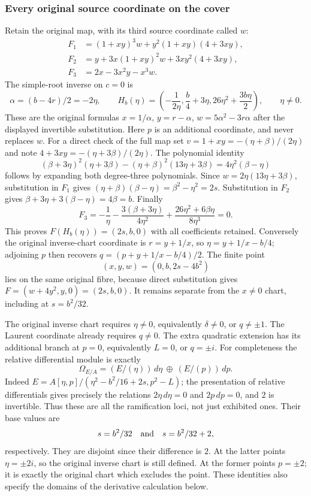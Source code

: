 \subsubsection{Every original source coordinate on the cover}
Retain the original map, with its third source coordinate called $w$:
\begin{align*}
 F_1&=(1+xy)^3w+y^2(1+xy)(4+3xy),\\
 F_2&=y+3x(1+xy)^2w+3xy^2(4+3xy),\\
 F_3&=2x-3x^2y-x^3w.
\end{align*}
The simple-root inverse on $c=0$ is
\begin{equation}\label{eq:rb-source-H}
 \alpha=(b-4r)/2=-2\eta,\qquad
 H_b(\eta)=
 \left(-\frac1{2\eta},\frac b4+3\eta,
                 26\eta^2+\frac{3b\eta}{2}\right),\qquad\eta\ne0.
\end{equation}
These are the original formulas $x=1/\alpha$, $y=r-\alpha$,
$w=5\alpha^2-3r\alpha$ after the displayed invertible substitution.
Here $p$ is an additional coordinate, and never replaces $w$.
For a direct check of the full map set
$v=1+xy=-(\eta+\beta)/(2\eta)$ and note
$4+3xy=-(\eta+3\beta)/(2\eta)$. The polynomial identity
\[
 (\beta+3\eta)^2(\eta+3\beta)
 -(\eta+\beta)^2(13\eta+3\beta)=4\eta^2(\beta-\eta)
\]
follows by expanding both degree-three polynomials. Since
$w=2\eta(13\eta+3\beta)$, substitution in $F_1$ gives
$(\eta+\beta)(\beta-\eta)=\beta^2-\eta^2=2s$.
Substitution in $F_2$ gives
$\beta+3\eta+3(\beta-\eta)=4\beta=b$. Finally
\[
 F_3=-\frac1\eta-\frac{3(\beta+3\eta)}{4\eta^2}
                       +\frac{26\eta^2+6\beta\eta}{8\eta^3}=0.
\]
This proves $F(H_b(\eta))=(2s,b,0)$ with all coefficients retained.
Conversely the original inverse-chart coordinate is
$r=y+1/x$, so $\eta=y+1/x-b/4$; adjoining $p$ then recovers
$q=(p+y+1/x-b/4)/2$. The finite point
\[
 (x,y,w)=(0,b,2s-4b^2)
\]
lies on the same original fibre, because direct substitution gives
$F=(w+4y^2,y,0)=(2s,b,0)$. It remains separate from the $x\ne0$
chart, including at $s=b^2/32$.

The original inverse chart requires $\eta\ne0$, equivalently
$\delta\ne0$, or $q\ne\pm1$. The Laurent coordinate already
requires $q\ne0$. The extra quadratic extension has its additional
branch at $p=0$, equivalently $L=0$, or $q=\pm i$.
For completeness the relative differential module is exactly
\[
 \Omega_{E/A}=
 (E/(\eta))\,d\eta\ \oplus\ (E/(p))\,dp.
\]
Indeed $E=A[\eta,p]/(\eta^2-b^2/16+2s,p^2-L)$; the presentation
of relative differentials gives precisely the relations
$2\eta\,d\eta=0$ and $2p\,dp=0$, and $2$ is invertible.
Thus these are all the ramification loci, not just exhibited ones.
Their base values are
\[
 s=b^2/32\quad\hbox{and}\quad s=b^2/32+2,
\]
respectively. They are disjoint since their difference is $2$.
At the latter points $\eta=\pm2i$, so the original inverse chart
is still defined. At the former points $p=\pm2$; it is exactly the
original chart which excludes the point. These identities also
specify the domains of the derivative calculation below.

